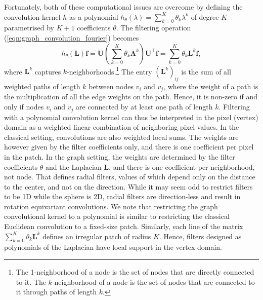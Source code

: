 \documentclass[final,twocolumn,3p,times,sort&compress]{elsarticle}
\newcommand{\eqnref}[1]{(\ref{eqn:#1})}
\renewcommand{\b}[1]{{\bm{#1}}}   %
\newcommand{\1}{\b{1}}              %
\newcommand{\0}{\b{0}}              %
\renewcommand{\L}{\b{L}}
\newcommand{\U}{\b{U}}
\newcommand{\f}{\b{f}}
\newcommand{\trans}{^\intercal}
\newcommand{\bLambda}{\b{\Lambda}}
\begin{document}
Fortunately, both of these computational issues are overcome by defining the convolution kernel $h$ as a polynomial $h_\theta(\lambda) = \sum_{k=0}^K \theta_k \lambda^k$ of degree $K$ parametrised by $K+1$ coefficients $\theta$.
The filtering operation \eqnref{graph_convolution_fourier} becomes
\begin{equation} \label{eqn:graph_convolution_monomial}
	h_\theta(\L) \f =  \U \left(\sum_{k=0}^K \theta_k \bLambda^k \right) \U\trans \f = \sum_{k=0}^K \theta_k \L^k \f,
\end{equation}
where $\L^k$ captures $k$-neighborhoods.\footnote{The 1-neighborhood of a node is the set of nodes that are directly connected to it. The $k$-neighborhood of a node is the set of nodes that are connected to it through paths of length $k$.}
The entry $(\L^k)_{ij}$ is the sum of all weighted paths of length $k$ between nodes $v_i$ and $v_j$, where the weight of a path is the multiplication of all the edge weights on the path.
Hence, it is non-zero if and only if nodes $v_i$ and $v_j$ are connected by at least one path of length $k$.
Filtering with a polynomial convolution kernel can thus be interpreted in the pixel (vertex) domain as a weighted linear combination of neighboring pixel values.
In the classical setting, convolutions are also weighted local sums.
The weights are however given by the filter coefficients only, and there is one coefficient per pixel in the patch.
In the graph setting, the weights are determined by the filter coefficients $\theta$ and the Laplacian $\L$, and there is one coefficient per neighborhood, not node.
That defines radial filters, values of which depend only on the distance to the center, and not on the direction.
While it may seem odd to restrict filters to be 1D while the sphere is 2D, radial filters are direction-less and result in rotation equivariant convolutions.
We note that restricting the graph convolutional kernel to a polynomial is similar to restricting the classical Euclidean convolution to a fixed-size patch.
Similarly, each line of the matrix $\sum_{k=0}^K \theta_k \L^k$ defines an irregular patch of radius $K$.
Hence, filters designed as polynomials of the Laplacian have local support in the vertex domain.
\end{document}
